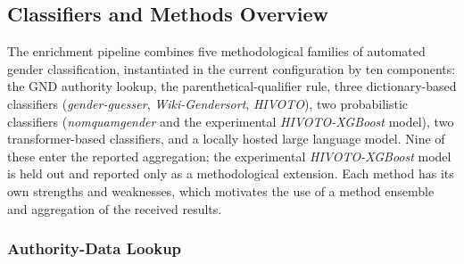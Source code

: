 \documentclass{eceasst}
\begin{document}
\subsection{Classifiers and Methods Overview}
\label{sec:classifiers}
The enrichment pipeline combines five methodological families of automated gender classification, instantiated in the current configuration by ten components: the GND authority lookup, the parenthetical-qualifier rule, three dictionary-based classifiers (\textit{gender-guesser}, \textit{Wiki-Gendersort}, \textit{HIVOTO}), two probabilistic classifiers (\textit{nomquamgender} and the experimental \textit{HIVOTO-XGBoost} model), two transformer-based classifiers, and a locally hosted large language model. Nine of these enter the reported aggregation; the experimental \textit{HIVOTO-XGBoost} model is held out and reported only as a methodological extension. Each method has its own strengths and weaknesses, which motivates the use of a method ensemble and aggregation of the received results.

\subsubsection{Authority-Data Lookup}
\end{document}
